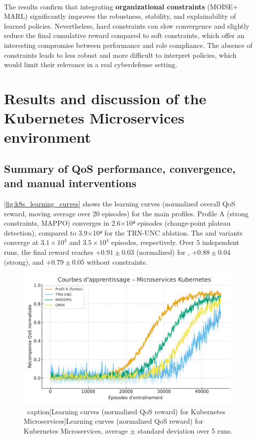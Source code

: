  \

  The results confirm that integrating \textbf{organizational constraints} (MOISE+ \allowbreak MARL) significantly improves the robustness, stability, and explainability of learned policies.
  Nevertheless, hard constraints can slow convergence and slightly reduce the final cumulative reward compared to soft constraints, which offer an interesting compromise between performance and role compliance.
  The absence of constraints leads to less robust and more difficult to interpret policies, which would limit their relevance in a real cyberdefense setting.


  \section{Results and discussion of the Kubernetes Microservices environment}\label{sec:results_and_discussion_ms}

  \subsection* {Summary of QoS performance, convergence, and manual interventions}

  \autoref{fig:k8s_learning_curves} shows the learning curves (normalized overall QoS reward, moving average over $20$ episodes) for the main profiles.
  Profile A (strong constraints, MAPPO) converges in 2.6×10⁴ episodes (change-point plateau detection), compared to 3.9×10⁴ for the TRN-UNC ablation.
  The  and  variants converge at $3.1\times 10^4$ and $3.5\times 10^4$ episodes, respectively.
  Over $5$ independent runs, the final reward reaches $+0.91 \pm 0.03$ (normalized) for , $+0.88 \pm 0.04$ (strong), and $+0.79 \pm 0.05$ without constraints.

  \begin{figure}[h!]
    \centering
    \includegraphics[width=0.75\linewidth]{figures/results_k8s_learning.pdf}
    \ caption[Learning curves (normalized QoS reward) for Kubernetes Microservices]{Learning curves (normalized QoS reward) for Kubernetes Microservices, average $\pm$ standard deviation over 5 runs.}
    \label{fig:k8s_learning_curves}
  \end{figure}

